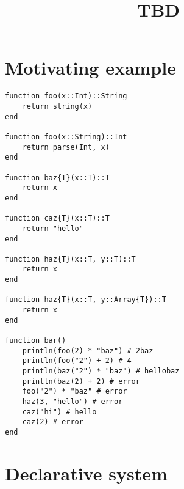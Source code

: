 \documentclass{report} %
\begin{document}
	
\title{TBD}
\maketitle	
	

\section*{Motivating example}

\begin{verbatim}
function foo(x::Int)::String
    return string(x)
end

function foo(x::String)::Int
    return parse(Int, x)
end

function baz{T}(x::T)::T
    return x
end

function caz{T}(x::T)::T
    return "hello"
end

function haz{T}(x::T, y::T)::T
    return x
end

function haz{T}(x::T, y::Array{T})::T
    return x
end

function bar()
    println(foo(2) * "baz") # 2baz
    println(foo("2") + 2) # 4
    println(baz("2") * "baz") # hellobaz
    println(baz(2) + 2) # error
    foo("2") * "baz" # error
    haz(3, "hello") # error
    caz("hi") # hello
    caz(2) # error
end

\end{verbatim}


\section*{Declarative system}
\end{document}
